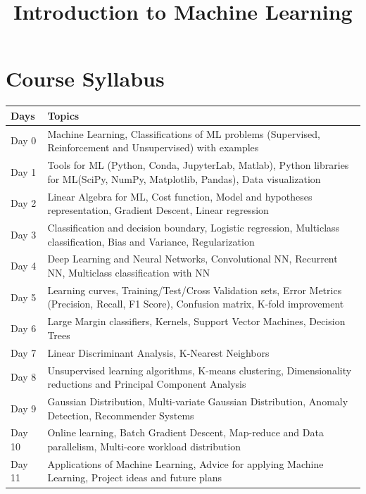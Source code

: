 \documentclass[11pt]{article}
\title{Introduction to Machine Learning}
\date{}
\begin{document}
\maketitle
\section{Course Syllabus}
\begin{center}
\begin{tabular}{|m{1.15cm}|m{15cm}|}
\hline
Days &Topics\\ \hline
Day 0 & Machine Learning, Classifications of ML problems (Supervised, Reinforcement and Unsupervised) with examples\\ \hline
Day 1 & Tools for ML (Python, Conda, JupyterLab, Matlab), Python libraries for ML(SciPy, NumPy, Matplotlib, Pandas), Data visualization\\ \hline
Day 2 & Linear Algebra for ML, Cost function, Model and hypotheses representation, Gradient Descent, Linear regression\\ \hline
Day 3 & Classification and decision boundary, Logistic regression, Multiclass classification, Bias and Variance, Regularization\\ \hline
Day 4 & Deep Learning and Neural Networks, Convolutional NN, Recurrent NN, Multiclass classification with NN\\ \hline
Day 5 & Learning curves, Training/Test/Cross Validation sets, Error Metrics (Precision, Recall, F1 Score), Confusion matrix, K-fold improvement\\ \hline
Day 6 & Large Margin classifiers, Kernels, Support Vector Machines, Decision Trees\\ \hline
Day 7 & Linear Discriminant Analysis, K-Nearest Neighbors\\ \hline
Day 8 & Unsupervised learning algorithms, K-means clustering, Dimensionality reductions and Principal Component Analysis\\ \hline
Day 9 & Gaussian Distribution, Multi-variate Gaussian Distribution, Anomaly Detection, Recommender Systems\\ \hline
Day 10 & Online learning, Batch Gradient Descent, Map-reduce and Data parallelism, Multi-core workload distribution\\ \hline
Day 11 & Applications of Machine Learning, Advice for applying Machine Learning, Project ideas and future plans\\ \hline
\end{tabular}
\end{center}
\end{document}
